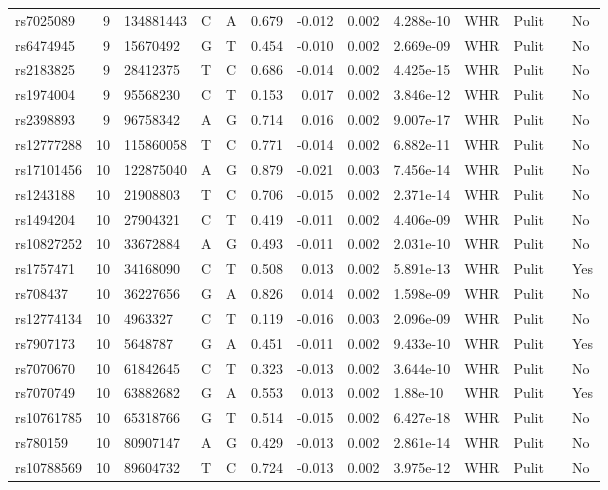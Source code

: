 \documentclass[11pt,twoside]{bristolthesis}
\begin{document}
\begin{longtable}[t]{lrlllrrrlllll}
rs7025089 & 9 & 134881443 & C & A & 0.679 & -0.012 & 0.002 & 4.288e-10 & WHR & Pulit &  & No\\
rs6474945 & 9 & 15670492 & G & T & 0.454 & -0.010 & 0.002 & 2.669e-09 & WHR & Pulit &  & No\\
rs2183825 & 9 & 28412375 & T & C & 0.686 & -0.014 & 0.002 & 4.425e-15 & WHR & Pulit &  & No\\
rs1974004 & 9 & 95568230 & C & T & 0.153 & 0.017 & 0.002 & 3.846e-12 & WHR & Pulit &  & No\\
\addlinespace
rs2398893 & 9 & 96758342 & A & G & 0.714 & 0.016 & 0.002 & 9.007e-17 & WHR & Pulit &  & No\\
rs12777288 & 10 & 115860058 & T & C & 0.771 & -0.014 & 0.002 & 6.882e-11 & WHR & Pulit &  & No\\
rs17101456 & 10 & 122875040 & A & G & 0.879 & -0.021 & 0.003 & 7.456e-14 & WHR & Pulit &  & No\\
rs1243188 & 10 & 21908803 & T & C & 0.706 & -0.015 & 0.002 & 2.371e-14 & WHR & Pulit &  & No\\
rs1494204 & 10 & 27904321 & C & T & 0.419 & -0.011 & 0.002 & 4.406e-09 & WHR & Pulit &  & No\\
\addlinespace
rs10827252 & 10 & 33672884 & A & G & 0.493 & -0.011 & 0.002 & 2.031e-10 & WHR & Pulit &  & No\\
rs1757471 & 10 & 34168090 & C & T & 0.508 & 0.013 & 0.002 & 5.891e-13 & WHR & Pulit &  & Yes\\
rs708437 & 10 & 36227656 & G & A & 0.826 & 0.014 & 0.002 & 1.598e-09 & WHR & Pulit &  & No\\
rs12774134 & 10 & 4963327 & C & T & 0.119 & -0.016 & 0.003 & 2.096e-09 & WHR & Pulit &  & No\\
rs7907173 & 10 & 5648787 & G & A & 0.451 & -0.011 & 0.002 & 9.433e-10 & WHR & Pulit &  & Yes\\
\addlinespace
rs7070670 & 10 & 61842645 & C & T & 0.323 & -0.013 & 0.002 & 3.644e-10 & WHR & Pulit &  & No\\
rs7070749 & 10 & 63882682 & G & A & 0.553 & 0.013 & 0.002 & 1.88e-10 & WHR & Pulit &  & Yes\\
rs10761785 & 10 & 65318766 & G & T & 0.514 & -0.015 & 0.002 & 6.427e-18 & WHR & Pulit &  & No\\
rs780159 & 10 & 80907147 & A & G & 0.429 & -0.013 & 0.002 & 2.861e-14 & WHR & Pulit &  & No\\
rs10788569 & 10 & 89604732 & T & C & 0.724 & -0.013 & 0.002 & 3.975e-12 & WHR & Pulit &  & No\\

\end{longtable}
\end{document}
